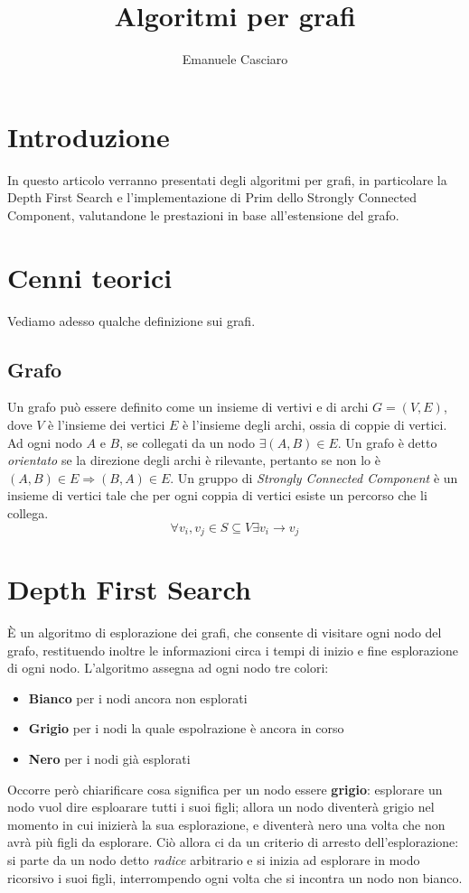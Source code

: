 \documentclass{article}
\author{Emanuele Casciaro}
\title{Algoritmi per grafi}
\begin{document}
\maketitle
\tableofcontents

\newpage

\section{Introduzione}
In questo articolo verranno presentati degli algoritmi per grafi, in particolare la Depth First Search e l'implementazione di Prim dello Strongly Connected Component, valutandone le prestazioni in base all'estensione del grafo.

\section{Cenni teorici}
Vediamo adesso qualche definizione sui grafi.

\subsection{Grafo}
Un grafo può essere definito come un insieme di vertivi e di archi $G = (V, E)$, dove $V$ è l'insieme dei vertici $E$ è l'insieme degli archi, ossia di coppie di vertici. Ad ogni nodo $A$ e $B$, se collegati da un nodo $\exists (A, B) \in E$.
\newline
Un grafo è detto \textit{orientato} se la direzione degli archi è rilevante, pertanto se non lo è $(A, B) \in E \Rightarrow (B, A) \in E$.
Un gruppo di \textit{Strongly Connected Component} è un insieme di vertici tale che per ogni coppia di vertici esiste un percorso che li collega.
$$ \forall v_i, v_j \in S \subseteq V \exists v_i \rightarrow v_j $$

\section{Depth First Search}
È un algoritmo di esplorazione dei grafi, che consente di visitare ogni nodo del grafo, restituendo inoltre le informazioni circa i tempi di inizio e fine esplorazione di ogni nodo. L'algoritmo assegna ad ogni nodo tre colori:
\begin{itemize}
	\item \textbf{Bianco} per i nodi ancora non esplorati
	\item \textbf{Grigio} per i nodi la quale espolrazione è ancora in corso
	\item \textbf{Nero} per i nodi già esplorati
\end{itemize}
Occorre però chiarificare cosa significa per un nodo essere \textbf{grigio}: esplorare un nodo vuol dire esploarare tutti i suoi figli; allora un nodo diventerà grigio nel momento in cui inizierà la sua esplorazione, e diventerà nero una volta che non avrà più figli da esplorare.
Ciò allora ci da un criterio di arresto dell'esplorazione: si parte da un nodo detto \textit{radice} arbitrario e si inizia ad esplorare in modo ricorsivo i suoi figli, interrompendo ogni volta che si incontra un nodo non bianco.
\end{document}
